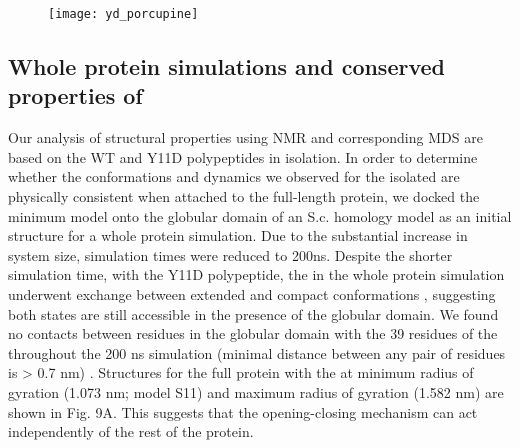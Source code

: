 
\begin{figure}
\texttt{[image: yd\_porcupine]}
\label{fig:porcupine}
\end{figure}  


\subsection{Whole protein simulations and conserved properties of \gct}

Our analysis of \gct structural properties using NMR and corresponding MDS are based on the WT and Y11D \gct polypeptides in isolation. In order to determine whether the conformations and dynamics we observed for the isolated \gct are physically consistent when attached to the full-length \tub protein, we docked the minimum \diffusion \gct model  onto the globular domain of an S.c. \tub homology model as an initial structure for a whole protein simulation. Due to the substantial increase in system size, simulation times were reduced to 200ns.  Despite the shorter simulation time, with the Y11D \gct polypeptide, the \gct in the whole protein simulation underwent exchange between extended and compact conformations , suggesting both states are still accessible in the presence of the globular domain. We found no contacts between residues in the globular domain with the 39 residues of the \gct throughout the 200 ns simulation (minimal distance between any pair of residues is > 0.7 nm) . Structures for the full protein with the \gct at minimum radius of gyration (1.073 nm; model S11) and maximum radius of gyration (1.582 nm) are shown in Fig. 9A. This suggests that the \gct opening-closing mechanism can act independently of the rest of the protein.



